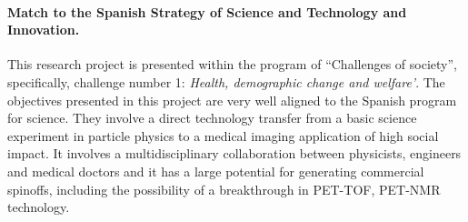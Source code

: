\paragraph{Match to the Spanish Strategy of Science and Technology and Innovation.}

This research project is presented within the program of ``Challenges of society'', specifically, challenge number 1: \emph{Health, demographic change and welfare'}. The objectives presented in this project are very well aligned to the Spanish program for science. They involve a direct technology transfer from a basic science experiment in particle physics to a medical imaging application of high social impact. It involves a multidisciplinary collaboration between physicists, engineers and medical doctors and it has a large potential for generating commercial spinoffs, including the possibility of a breakthrough in  PET-TOF, PET-NMR technology.  
\\
\\